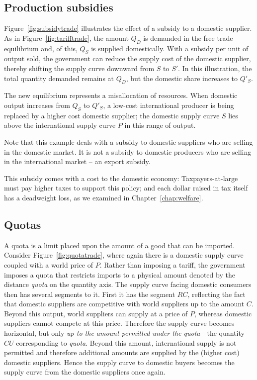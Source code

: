\newhtmlpage

\subsection*{Production subsidies}

Figure~\ref{fig:subsidytrade} illustrates the effect of a subsidy to a
domestic supplier. As in Figure~\ref{fig:tarifftrade}, the amount $Q_D$ is
demanded in the free trade equilibrium and, of this, $Q_S$ is supplied
domestically. With a subsidy per unit of output sold, the government can
reduce the supply cost of the domestic supplier, thereby shifting the supply
curve downward from $S$ to $S'$. In this illustration, the total
quantity demanded remains at $Q_D$, but the domestic share increases to 
$Q'_S$.



\newhtmlpage

The new equilibrium represents a misallocation of resources. When domestic
output increases from $Q_S$ to $Q'_S$, a low-cost international
producer is being replaced by a higher cost domestic supplier; the domestic
supply curve $S$ lies above the international supply curve $P$ in this range
of output.

Note that this example deals with a subsidy to domestic suppliers who are
selling in the domestic market. It is not a subsidy to domestic producers
who are selling in the international market -- an export subsidy.

This subsidy comes with a cost to the domestic economy: Taxpayers-at-large
must pay higher taxes to support this policy; and each dollar raised in tax
itself has a deadweight loss, as we examined in Chapter~\ref{chap:welfare}.

\newhtmlpage

\subsection*{Quotas}

A quota is a limit placed upon the amount of a good that can be imported.
Consider Figure~\ref{fig:quotatrade}, where again there is a domestic supply
curve coupled with a world price of $P$. Rather than imposing a tariff, the
government imposes a quota that restricts imports to a physical amount
denoted by the distance \textit{quota} on the quantity axis. The supply
curve facing domestic consumers then has several segments to it. First it
has the segment $RC$, reflecting the fact that domestic suppliers are
competitive with world suppliers up to the amount $C$. Beyond this output,
world suppliers can supply at a price of $P$, whereas domestic suppliers
cannot compete at this price. Therefore the supply curve becomes horizontal,
but only \textit{up to the amount permitted under the quota}---the quantity 
$CU$ corresponding to \textit{quota}. Beyond this amount, international
supply is not permitted and therefore additional amounts are supplied by the
(higher cost) domestic suppliers. Hence the supply curve to domestic buyers
becomes the supply curve from the domestic suppliers once again.

